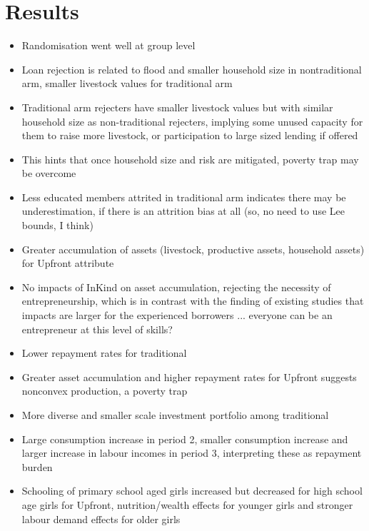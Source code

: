 \section{Results}
\label{SecResults}





\begin{itemize}
\vspace{1.0ex}\setlength{\itemsep}{1.0ex}\setlength{\baselineskip}{12pt}
\item	Randomisation went well at group level
\item	Loan rejection is related to flood and smaller household size in nontraditional arm, smaller livestock values for traditional arm
\item	Traditional arm rejecters have smaller livestock values but with similar household size as non-traditional rejecters, implying some unused capacity for them to raise more livestock, or participation to large sized lending if offered
\item	This hints that once household size and risk are mitigated, poverty trap may be overcome
\item	Less educated members attrited in traditional arm indicates there may be underestimation, if there is an attrition bias at all (so, no need to use Lee bounds, I think)
\item	Greater accumulation of assets (livestock, productive assets, household assets) for \textsf{Upfront} attribute
\item	No impacts of \textsf{InKind} on asset accumulation, rejecting the necessity of entrepreneurship, which is in contrast with the finding of existing studies that impacts are larger for the experienced borrowers ... everyone can be an entrepreneur at this level of skills? 
\item	Lower repayment rates for \textsf{traditional}
\item	Greater asset accumulation and higher repayment rates for \textsf{Upfront} suggests nonconvex production, a poverty trap
\item	More diverse and smaller scale investment portfolio among \textsf{traditional}
\item	Large consumption increase in period 2, smaller consumption increase and larger increase in labour incomes in period 3, interpreting these as repayment burden
\item	Schooling of primary school aged girls increased but decreased for high school age girls for \textsf{Upfront}, nutrition/wealth effects for younger girls and stronger labour demand effects for older girls 
\end{itemize}



